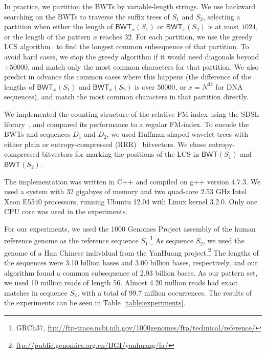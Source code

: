 \documentclass{llncs}
\newcommand{\BWT}
  {\ensuremath{\mathsf{BWT}}}
\begin{document}
In practice, we partition the BWTs by variable-length strings. We use backward searching on the BWTs to traverse the suffix trees of $S_{1}$ and $S_{2}$, selecting a partition when either the length of $\BWT_{x}(S_{1})$ or $\BWT_{x}(S_{2})$ is at most $1024$, or the length of the pattern $x$ reaches $32$. For each partition, we use the greedy LCS algorithm~\cite{Myers86} to find the longest common subsequence of that partition. To avoid hard cases, we stop the greedy algorithm if it would need diagonals beyond $\pm 50000$, and match only the most common characters for that partition. We also predict in advance the common cases where this happens (the difference of the lengths of $\BWT_{x}(S_{1})$ and $\BWT_{x}(S_{2})$ is over $50000$, or $x = N^{32}$ for DNA sequences), and match the most common characters in that partition directly.

We implemented the counting structure of the relative FM-index using the SDSL library~\cite{Gog2014b}, and compared its performance to a regular FM-index. To encode the BWTs and sequences $D_{1}$ and $D_{2}$, we used Huffman-shaped wavelet trees with either plain or entropy-compressed (RRR)~\cite{Raman2007} bitvectors. We chose entropy-compressed bitvectors for marking the positions of the LCS in $\BWT(S_{1})$ and $\BWT(S_{2})$.

The implementation was written in C++ and compiled on g++ version 4.7.3. We used a system with 32 gigabyes of memory and two quad-core 2.53 GHz Intel Xeon E5540 processors, running Ubuntu 12.04 with Linux kernel 3.2.0. Only one CPU core was used in the experiments.

For our experiments, we used the 1000 Genomes Project assembly of the human reference genome as the reference sequence $S_{1}$.\footnote{GRCh37, \url{ftp://ftp-trace.ncbi.nih.gov/1000genomes/ftp/technical/reference/}} As sequence $S_{2}$, we used the genome of a Han Chinese individual from the YanHuang project.\footnote{\url{ftp://public.genomics.org.cn/BGI/yanhuang/fa/}} The lengths of the sequences were 3.10 billion bases and 3.00 billion bases, respectively, and our algorithm found a common subsequence of 2.93 billion bases. As our pattern set, we used 10 million reads of length 56. Almost 4.20 million reads had exact matches in sequence $S_{2}$, with a total of 99.7 million occurrences. The results of the experiments can be seen in Table~\ref{table:experiments}.
\end{document}
